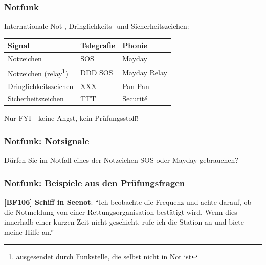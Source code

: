 \begin{frame}
  \frametitle{Notfunk}

  Internationale Not-, Dringlichkeits- und Sicherheitszeichen:

  \begin{center}
    \begin{tabular}{|l|l|l|}\hline
      \textbf{Signal}       & \textbf{Telegrafie} & \textbf{Phonie} \\ \hline \hline
      Notzeichen            & SOS                 & Mayday          \\ \hline
      Notzeichen (relay\footnote{ausgesendet durch Funkstelle, die selbst nicht in Not ist})
      & DDD SOS & Mayday Relay \\ \hline
      Dringlichkeitszeichen & XXX                 & Pan Pan          \\ \hline
      Sicherheitszeichen    & TTT                 & Securité         \\ \hline
    \end{tabular}
  \end{center}

  Nur FYI - keine Angst, kein Prüfungsstoff!

\end{frame}

\begin{frame}
  \frametitle{Notfunk: Notsignale}

  \begin{exampleblock}{Dürfen Sie im Notfall eines der Notzeichen SOS oder Mayday gebrauchen?}
  \end{exampleblock}


\end{frame}

\begin{frame}
  \frametitle{Notfunk: Beispiele aus den Prüfungsfragen}

  \textbf{[BF106] Schiff in Seenot}: ``Ich beobachte die Frequenz und achte
  darauf, ob die Notmeldung von einer Rettungsorganisation bestätigt wird.
  Wenn dies innerhalb einer kurzen Zeit nicht geschieht, rufe ich die Station
  an und biete meine Hilfe an.'' \\[2em]

\end{frame}

